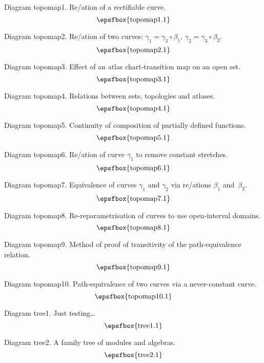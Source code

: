 
\secteject
\edef\SECTtopomap{\the\pageno}

Diagram topomap1. Re\parametris/ation of a rectifiable curve.
$$
\centerline{\epsfbox{topomap1.1}}
$$

Diagram topomap2. Re\parametris/ation of two curves:
$\gamma_1=\gamma_3\circ\beta_1$, $\gamma_2=\gamma_3\circ\beta_2$.
$$
\centerline{\epsfbox{topomap2.1}}
$$

Diagram topomap3. Effect of an atlas chart-transition map on an open set.
$$
\centerline{\epsfbox{topomap3.1}}
$$

Diagram topomap4. Relations between sets, topologies and atlases.
$$
\centerline{\epsfbox{topomap4.1}}
$$

\filleject

Diagram topomap5. Continuity of composition of partially defined functions.
$$
\centerline{\epsfbox{topomap5.1}}
$$

Diagram topomap6. Re\parametris/ation of curve $\gamma_1$ to remove constant
stretches.
$$
\centerline{\epsfbox{topomap6.1}}
$$

Diagram topomap7. Equivalence of curves $\gamma_1$ and $\gamma_2$ via
re\parametris/ations $\beta_1$ and~$\beta_2$.
$$
\centerline{\epsfbox{topomap7.1}}
$$

Diagram topomap8. Re-reparametrisation of curves to use open-interval domains.
$$
\centerline{\epsfbox{topomap8.1}}
$$

\filleject

Diagram topomap9. Method of proof of transitivity of the path-equivalence
relation.
$$
\centerline{\epsfbox{topomap9.1}}
$$

Diagram topomap10. Path-equivalence of two curves via a never-constant curve.
$$
\centerline{\epsfbox{topomap10.1}}
$$

\secteject
\edef\SECTtree{\the\pageno}

Diagram tree1. Just testing\dots
$$
\centerline{\epsfbox{tree1.1}}
$$

Diagram tree2. A family tree of modules and algebras.
$$
\centerline{\epsfbox{tree2.1}}
$$

